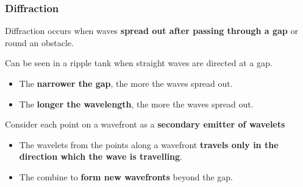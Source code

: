 \subsubsection*{Diffraction}

Diffraction occurs when waves \textbf{spread out after passing through a gap} or round an obstacle.

Can be seen in a ripple tank when straight waves are directed at a gap.
\begin{itemize}
    \item The \textbf{narrower the gap}, the more the waves spread out.
    \item The \textbf{longer the wavelength}, the more the waves spread out.
\end{itemize}

Consider each point on a wavefront as a \textbf{secondary emitter of wavelets}
\begin{itemize}
    \item The wavelets from the points along a wavefront \textbf{travels only in the direction which the wave is travelling}.
    \item The combine to \textbf{form new wavefronts} beyond the gap.
\end{itemize}
